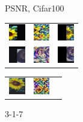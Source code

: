 \begin{figure}[h]
\begin{subtable}{.30\linewidth}
\begin{tabular}{|l|ll|}
\end{tabular}
\caption{PSNR, Cifar100}\label{tab:erpsnr}
\end{subtable}%
\hfill
\begingroup
\setlength{\tabcolsep}{1.8pt}
\begin{subtable}{.11\linewidth}\centering
{\begin{tabular}{ l l l }
  \includegraphics[width = 20pt]{enhimages317/ori_77.jpg} &  \includegraphics[width = 20pt]{defimages317/rec_77.jpg} &
   \includegraphics[width = 20pt]{enhimages317/rec_77.jpg} \\
  \includegraphics[width = 20pt]{enhimages317/ori_91.jpg} &  \includegraphics[width = 20pt]{defimages317/rec_91.jpg} &
   \includegraphics[width = 20pt]{enhimages317/rec_91.jpg} \\
\end{tabular}}
\caption{3-1-7}%
\end{subtable}%
\hfill
\begin{subtable}{.11\linewidth}\centering
{\begin{tabular}{ l l l }
  \includegraphics[width = 20pt]{enhimages431818/ori_77.jpg} &  \includegraphics[width = 20pt]{defimages431818/rec_77.jpg} &

\end{tabular}}
\end{subtable}
\end{figure}
